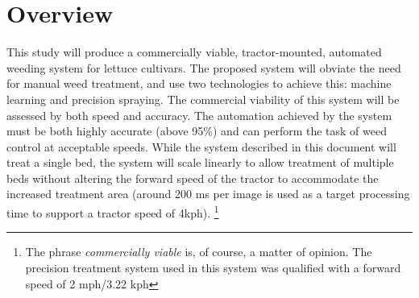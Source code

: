 \documentclass[12pt]{article}
\begin{document}
\section{Overview}

\label{section:proposal}
This study will produce a commercially viable, tractor-mounted, automated weeding system for lettuce cultivars. The proposed system will obviate the need for manual weed treatment, and use two technologies to achieve this: machine learning and precision spraying. The commercial viability of this system will be assessed by both speed and accuracy. The automation achieved by the system must be both highly accurate (above 95\%) and  can perform the task of weed control at acceptable speeds. While the system described in this document will treat a single bed, the system will scale linearly to allow treatment of multiple beds without altering the forward speed of the tractor to accommodate the increased treatment area (around 200 ms per image is used as a target processing time to support a tractor speed of 4kph). \footnote{The phrase \textit{commercially viable} is, of course, a matter of opinion. The precision treatment system used in this system was qualified with a forward speed of 2 mph/3.22 kph}
\end{document}
